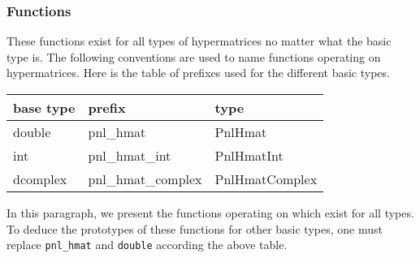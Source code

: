 \subsubsection{Functions}
These functions exist for all types of hypermatrices no matter what the basic type
is. The following conventions are used to name functions operating on hypermatrices.
Here is the table of prefixes used for the different basic types.

\begin{center}
  \begin{tabular}[t]{lll}
    base type & prefix & type\\
    \hline
    double & pnl_hmat & PnlHmat \\
    \hline
    int & pnl_hmat_int & PnlHmatInt \\
    \hline
    dcomplex & pnl_hmat_complex & PnlHmatComplex
  \end{tabular}
\end{center}

In this paragraph, we present the functions operating on \PnlHmat
which exist for all types. To deduce the prototypes of these functions for
other basic types, one must replace {\tt pnl_hmat} and {\tt double} according
the above table.


